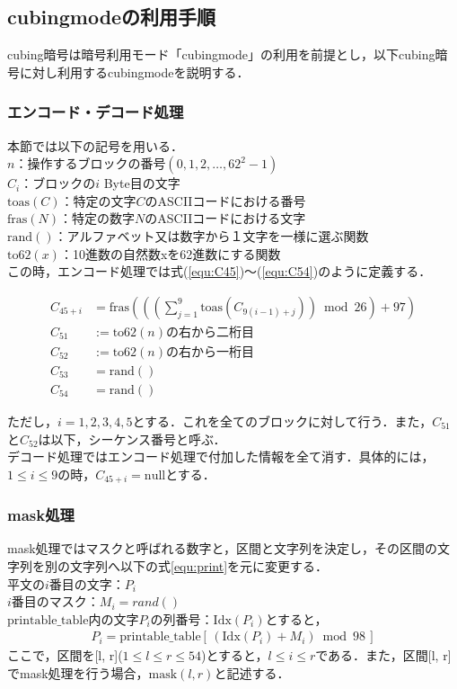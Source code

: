 \documentclass[a4j,titlepage]{jsarticle}
\begin{document}
\subsection{cubingmodeの利用手順}
cubing暗号は暗号利用モード「cubingmode」の利用を前提とし，以下cubing暗号に対し利用するcubingmodeを説明する．

\subsubsection{エンコード・デコード処理}
本節では以下の記号を用いる．\\
\noindent
\(n\)：操作するブロックの番号\((0,1,2,\dots,62^2-1)\)\\
\(C_i\)：ブロックの\(i\) Byte目の文字\\
\(\mathrm{toas}(C)\)：特定の文字\(C\)のASCIIコードにおける番号\\
\(\mathrm{fras}(N)\)：特定の数字\(N\)のASCIIコードにおける文字\\
\(\mathrm{rand}()\)：アルファベット又は数字から１文字を一様に選ぶ関数\\
\(\mathrm{to62}(x)\)：10進数の自然数xを62進数にする関数\\
この時，エンコード処理では式(\ref{equ:C45})〜(\ref{equ:C54})のように定義する．

\begin{align}
  C_{45 + i} &= \mathrm{fras} \left( \left( \left( \sum_{j = 1}^9 \mathrm{toas}(C_{9 \left( i - 1 \right) + j} )\right)\bmod 26 \right) + 97 \right) \label{equ:C45}\\
  C_{51} &:= \mathrm{to62}(n)の右から二桁目 \\
  C_{52} &:= \mathrm{to62}(n)の右から一桁目 \\
  C_{53} &= \mathrm{rand}() \\
  C_{54} &= \mathrm{rand}() \label{equ:C54}
\end{align}

ただし，\(i=1,2,3,4,5\)とする．これを全てのブロックに対して行う．また，\(C_{51}\)と\(C_{52}\)は以下，シーケンス番号と呼ぶ．\\
デコード処理ではエンコード処理で付加した情報を全て消す．具体的には，\(1 \leq i \leq 9\)の時，\(C_{45+i}=\mathrm{null}\)とする．

\subsubsection{mask処理}
mask処理ではマスクと呼ばれる数字と，区間と文字列を決定し，その区間の文字列を別の文字列へ以下の式\ref{equ:print}を元に変更する．\\
平文の\(i\)番目の文字：\(P_i\)\\
\(i\)番目のマスク：\(M_i = rand()\)\\
\(\mathrm{printable\_table}\)内の文字\(P_i\)の列番号：\(\mathrm{Idx}(P_i)\)とすると，
\begin{align}
  P_i=\mathrm{printable\_table}[\,(\mathrm{Idx}(P_i)+M_i) \bmod 98\,]\label{equ:print}
\end{align}
ここで，区間を[l, r](\(1 \leq l \leq r \leq 54\))とすると，\(l\leq i \leq r\)である．また，区間[l, r]でmask処理を行う場合，\(\mathrm{mask}(l, r)\)と記述する．
\end{document}
